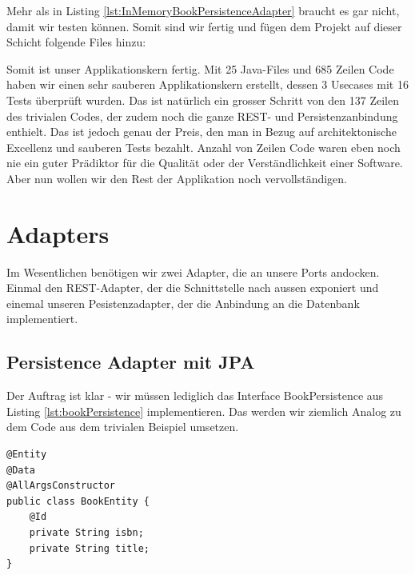 Mehr als in Listing \ref{lst:InMemoryBookPersistenceAdapter} braucht es gar 
nicht, damit wir testen können. 
Somit sind wir fertig und fügen dem Projekt auf dieser Schicht folgende
Files hinzu:

%

Somit ist unser Applikationskern fertig. Mit 25 Java-Files und 685 Zeilen 
Code haben wir einen sehr sauberen Applikationskern erstellt, dessen 3 
Usecases mit 16 Tests überprüft wurden. Das ist natürlich ein grosser Schritt
von den 137 Zeilen des trivialen Codes, der zudem noch die ganze REST- und 
Persistenzanbindung enthielt. Das ist jedoch genau der Preis, den man in Bezug
auf architektonische Excellenz und sauberen Tests bezahlt. Anzahl von Zeilen
Code waren eben noch nie ein guter Prädiktor für die Qualität oder der 
Verständlichkeit einer Software. Aber nun wollen wir den Rest der Applikation
noch vervollständigen.

\section{Adapters}
Im Wesentlichen benötigen wir zwei Adapter, die an unsere Ports andocken.
Einmal den REST-Adapter, der die Schnittstelle nach aussen exponiert und
einemal unseren Pesistenzadapter, der die Anbindung an die Datenbank
implementiert.

\subsection{Persistence Adapter mit JPA}

Der Auftrag ist klar - wir müssen lediglich das Interface BookPersistence aus 
Listing \ref{lst:bookPersistence} implementieren. Das werden wir ziemlich 
Analog zu dem Code aus dem trivialen Beispiel umsetzen.

\begin{listing}[H]
\begin{verbatim}
@Entity
@Data
@AllArgsConstructor
public class BookEntity {
    @Id
    private String isbn;
    private String title;
}
\end{verbatim}
\caption{BookEntity mit voller JPA und Lombok-Annotation}
\label{lst:BookEntity}
\end{listing}

